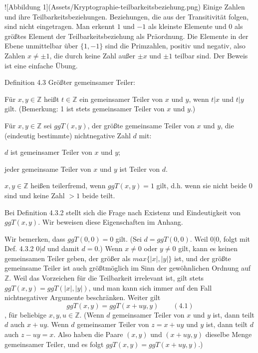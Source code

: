 \documentclass[a4paper]{article}
\begin{document}
\begin{multicols}{3}
    ![Abbildung 1](Assets/Kryptographie-teilbarkeitsbeziehung.png)
    Einige Zahlen und ihre Teilbarkeitsbeziehungen. Beziehungen, die aus der Transitivität folgen, sind nicht eingetragen. Man erkennt $1$ und $-1$ als kleinste Elemente und $0$ als größtes Element der Teilbarkeitsbeziehung als Präordnung. Die Elemente in der Ebene unmittelbar über $\{1,-1\}$ sind die Primzahlen, positiv und negativ, also Zahlen $x\not=\pm 1$, die durch keine Zahl außer $\pm x$ und $\pm 1$ teilbar sind.
    Der Beweis ist eine einfache Übung.

    Definition 4.3 Größter gemeinsamer Teiler:
    \begin{enumerate*}
        \item Für $x,y\in\mathbb{Z}$ heißt $t\in\mathbb{Z}$ ein gemeinsamer Teiler von $x$ und $y$, wenn $t|x$ und $t|y$ gilt. (Bemerkung: 1 ist stets gemeinsamer Teiler von $x$ und $y$.)
        \item  Für $x,y\in\mathbb{Z}$ sei $ggT(x, y)$, der größte gemeinsame Teiler von $x$ und $y$, die (eindeutig bestimmte) nichtnegative Zahl $d$ mit:
        \begin{itemize*}
            \item $d$ ist gemeinsamer Teiler von $x$ und $y$;
            \item jeder gemeinsame Teiler von $x$ und $y$ ist Teiler von $d$.
        \end{itemize*}
        \item  $x,y\in\mathbb{Z}$ heißen teilerfremd, wenn $ggT(x,y)=1$ gilt, d.h. wenn sie nicht beide $0$ sind und keine Zahl $>1$ beide teilt.
    \end{enumerate*}

    Bei Definition 4.3.2 stellt sich die Frage nach Existenz und Eindeutigkeit von $ggT(x,y)$. Wir beweisen diese Eigenschaften im Anhang.

    Wir bemerken, dass $ggT(0,0) = 0$ gilt. (Sei $d = ggT(0,0)$. Weil $0|0$, folgt mit Def. 4.3.2 $0|d$ und damit $d=0$.) Wenn $x\not= 0$ oder $y\not= 0$ gilt, kann es keinen gemeinsamen Teiler geben, der größer als $max\{|x|,|y|\}$ ist, und der größte gemeinsame Teiler ist auch größtmöglich im Sinn der gewöhnlichen Ordnung auf $\mathbb{Z}$. Weil das Vorzeichen für die Teilbarkeit irrelevant ist, gilt stets $ggT(x,y) = ggT(|x|,|y|)$, und man kann sich immer auf den Fall nichtnegativer Argumente beschränken. Weiter gilt $$ggT(x,y) = ggT(x+uy,y) \quad\quad(4.1)$$, für beliebige $x,y,u\in\mathbb{Z}$. (Wenn $d$ gemeinsamer Teiler von $x$ und $y$ ist, dann teilt $d$ auch $x+uy$. Wenn $d$ gemeinsamer Teiler von $z=x+uy$ und $y$ ist, dann teilt $d$ auch $z-uy =x$. Also haben die Paare $(x,y)$ und $(x+uy,y)$ dieselbe Menge gemeinsamer Teiler, und es folgt $ggT(x,y) = ggT(x+uy,y)$.)


\end{multicols}
\end{document}
